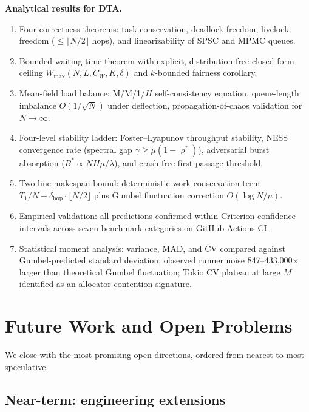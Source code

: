 \documentclass[11pt,a4paper]{article}
\begin{document}
\medskip
\noindent\textbf{Analytical results for DTA.}
\begin{enumerate}
  \item Four correctness theorems: task conservation, deadlock freedom,
        livelock freedom ($\leq\lfloor N/2\rfloor$ hops), and
        linearizability of SPSC and MPMC queues.
  \item Bounded waiting time theorem with explicit, distribution-free
        closed-form ceiling $W_{\max}(N,L,C_W,K,\delta)$ and $k$-bounded
        fairness corollary.
  \item Mean-field load balance: M/M/1/$H$ self-consistency equation,
        queue-length imbalance $O(1/\sqrt{N})$ under deflection,
        propagation-of-chaos validation for $N \to \infty$.
  \item Four-level stability ladder: Foster--Lyapunov throughput stability,
        NESS convergence rate (spectral gap $\gamma \geq \mu(1-\varrho^*)$),
        adversarial burst absorption ($B^* \propto NH\mu/\lambda$),
        and crash-free first-passage threshold.
  \item Two-line makespan bound: deterministic work-conservation term
        $T_1/N + \delta_{\mathrm{hop}}\cdot\lfloor N/2\rfloor$
        plus Gumbel fluctuation correction $O(\log N/\mu)$.
  \item Empirical validation: all predictions confirmed within
        Criterion confidence intervals across seven benchmark categories
        on GitHub Actions CI.
  \item Statistical moment analysis: variance, MAD, and CV compared
        against Gumbel-predicted standard deviation; observed runner
        noise 847--433{,}000$\times$ larger than theoretical Gumbel
        fluctuation; Tokio CV plateau at large $M$ identified as an
        allocator-contention signature.
\end{enumerate}

\section{Future Work and Open Problems}
\label{sec:future_work}

We close with the most promising open directions, ordered from nearest
to most speculative.

\subsection{Near-term: engineering extensions}
\end{document}
